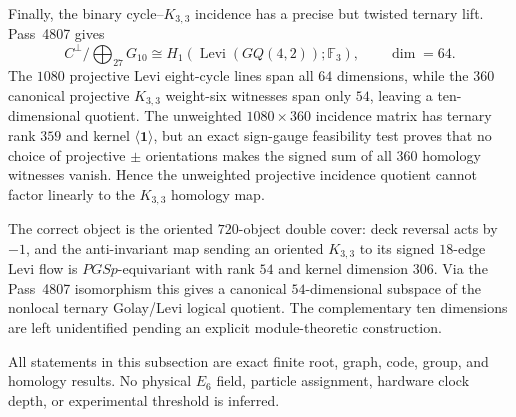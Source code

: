 Finally, the binary cycle--$K_{3,3}$ incidence has a precise but twisted ternary lift.  Pass~4807 gives
\[
C^\perp/\bigoplus_{27}G_{10}
\cong H_1(\operatorname{Levi}(GQ(4,2));\mathbb F_3),
\qquad \dim=64.
\]
The $1080$ projective Levi eight-cycle lines span all $64$ dimensions, while the $360$ canonical projective $K_{3,3}$ weight-six witnesses span only $54$, leaving a ten-dimensional quotient.  The unweighted $1080\times360$ incidence matrix has ternary rank $359$ and kernel $\langle\mathbf1\rangle$, but an exact sign-gauge feasibility test proves that no choice of projective $\pm$ orientations makes the signed sum of all $360$ homology witnesses vanish.  Hence the unweighted projective incidence quotient cannot factor linearly to the $K_{3,3}$ homology map.

The correct object is the oriented $720$-object double cover: deck reversal acts by $-1$, and the anti-invariant map sending an oriented $K_{3,3}$ to its signed $18$-edge Levi flow is $PGSp$-equivariant with rank $54$ and kernel dimension $306$.  Via the Pass~4807 isomorphism this gives a canonical $54$-dimensional subspace of the nonlocal ternary Golay/Levi logical quotient.  The complementary ten dimensions are left unidentified pending an explicit module-theoretic construction.

All statements in this subsection are exact finite root, graph, code, group, and homology results.  No physical $E_6$ field, particle assignment, hardware clock depth, or experimental threshold is inferred.
